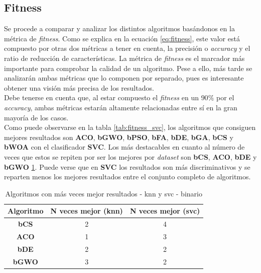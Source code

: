 \subsection{Fitness}
Se procede a comparar y analizar los distintos algoritmos basándonos en la métrica de \textit{fitness}. Como se explica en la ecuación \ref{eq:fitness}, este valor está compuesto por otras dos métricas a tener en cuenta, la precisión o \textit{accuracy} y el ratio de reducción de características. La métrica de \textit{fitness} es el marcador más importante para comprobar la calidad de un algoritmo. Pese a ello, más tarde se analizarán ambas métricas que lo componen por separado, pues es interesante obtener una visión más precisa de los resultados.\\[6pt]
Debe tenerse en cuenta que, al estar compuesto el \textit{fitness} en un $90\%$ por el \textit{accuracy}, ambas métricas estarán altamente relacionadas entre sí en la gran mayoría de los casos.\\[6pt]
Como puede observarse en la tabla \ref{tab:fitness_svc}, los algoritmos que consiguen mejores resultados son \textbf{ACO}, \textbf{bGWO}, \textbf{bPSO}, \textbf{bFA}, \textbf{bDE}, \textbf{bGA}, \textbf{bCS} y \textbf{bWOA} con el clasificador \textbf{SVC}. Los más destacables en cuanto al número de veces que estos se repiten por ser los mejores por \textit{dataset} son \textbf{bCS}, \textbf{ACO}, \textbf{bDE} y \textbf{bGWO} \ref{tab:n-best-fitness_combined}. Puede verse que en \textbf{SVC} los resultados son más discriminativos y se reparten menos los mejores resultados entre el conjunto completo de algoritmos.

\begin{table}[htp]
    \centering
    \begin{tabular}{ccc}
        \toprule
        Algoritmo     & N veces mejor (knn) & N veces mejor (svc) \\
        \midrule
        \textbf{bCS}  & 2                   & 4                   \\
        \textbf{ACO}  & 1                   & 3                   \\
        \textbf{bDE}  & 2                   & 2                   \\
        \textbf{bGWO} & 3                   & 2                   \\
        \bottomrule
    \end{tabular}
    \caption{Algoritmos con más veces mejor resultados - knn y svc - binario}
    \label{tab:n-best-fitness_combined}
\end{table}

